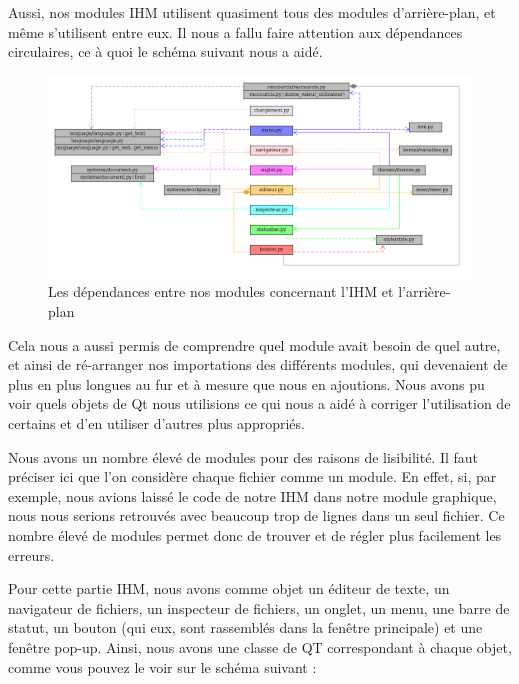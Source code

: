\documentclass[a4paper,12pt]{article}
\begin{document}
	\newpage
	
	Aussi, nos modules IHM utilisent quasiment tous des modules d'arrière-plan, et même s'utilisent entre eux. Il nous a fallu faire attention aux dépendances circulaires, ce à quoi le schéma suivant nous a aidé.
		
	\begin{figure}[h!]
		\begin{center}
			\includegraphics[scale=0.425]{images/imgs_uml/dependances_modules_gui.png}
				\caption{Les dépendances entre nos modules concernant l'IHM et l'arrière-plan}
		\end{center}
	\end{figure}
	
	\newpage
	
		Cela nous a aussi permis de comprendre quel module avait besoin de quel autre, et ainsi de ré-arranger nos importations des différents modules, qui devenaient de plus en plus longues au fur et à mesure que nous en ajoutions. Nous avons pu voir quels objets de Qt nous utilisions ce qui nous a aidé à corriger l'utilisation de certains et d'en utiliser d'autres plus appropriés.
		
Nous avons un nombre élevé de modules pour des raisons de lisibilité. Il faut préciser ici que l'on considère chaque fichier comme un module. En effet, si, par exemple, nous avions laissé le code de notre IHM dans notre module graphique, nous nous serions retrouvés avec beaucoup trop de lignes dans un seul fichier. Ce nombre élevé de modules permet donc de trouver et de régler plus facilement les erreurs.

Pour cette partie IHM, nous avons comme objet un éditeur de texte, un navigateur de fichiers, un inspecteur de fichiers, un onglet, un menu, une barre de statut, un bouton (qui eux, sont rassemblés dans la fenêtre principale) et une fenêtre pop-up. Ainsi, nous avons une classe de QT correspondant à chaque objet, comme vous pouvez le voir sur le schéma suivant :
		
\end{document}

